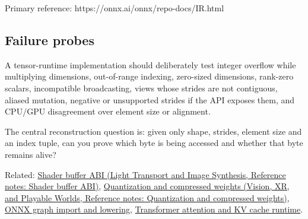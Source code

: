 Primary reference: https://onnx.ai/onnx/repo-docs/IR.html

\subsection{Failure probes}\label{appendix-cebadf3106d1-failure-probes}

A tensor-runtime implementation should deliberately test integer overflow while multiplying dimensions, out-of-range indexing, zero-sized dimensions, rank-zero scalars, incompatible broadcasting, views whose strides are not contiguous, aliased mutation, negative or unsupported strides if the API exposes them, and CPU/GPU disagreement over element size or alignment.

The central reconstruction question is: given only shape, strides, element size and an index tuple, can you prove which byte is being accessed and whether that byte remains alive?

Related: \href{../04-Light-Transport-and-Image-Synthesis/main.pdf\#nameddest=appendix-749048795dbb}{Shader buffer ABI (Light Transport and Image Synthesis, Reference notes: Shader buffer ABI)}, \href{../07-Vision-XR-and-Playable-Worlds/main.pdf\#nameddest=appendix-fdc7879e8bf2}{Quantization and compressed weights (Vision, XR, and Playable Worlds, Reference notes: Quantization and compressed weights)}, \hyperref[appendix-a87217e3af2b]{ONNX graph import and lowering}, \hyperref[appendix-ea2dadd21ce5]{Transformer attention and KV cache runtime}.
